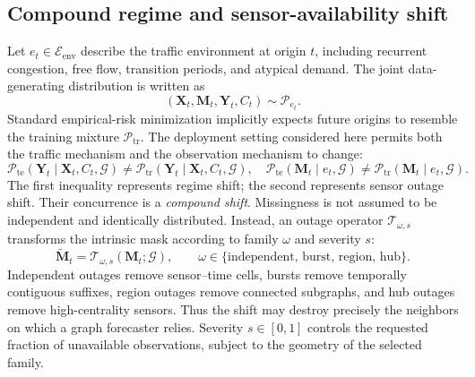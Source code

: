 \documentclass[preprint,12pt]{elsarticle}
\begin{document}
\subsection{Compound regime and sensor-availability shift}
Let $e_t\in\mathcal{E}_{\mathrm{env}}$ describe the traffic environment at
origin $t$, including recurrent congestion, free flow, transition periods, and
atypical demand. The joint data-generating distribution is written as
\begin{equation}
 (\mathbf{X}_t,\mathbf{M}_t,\mathbf{Y}_t,C_t)\sim
 \mathcal{P}_{e_t}.
\end{equation}
Standard empirical-risk minimization implicitly expects future origins to
resemble the training mixture $\mathcal{P}_{\mathrm{tr}}$. The deployment
setting considered here permits both the traffic mechanism and the observation
mechanism to change:
\begin{equation}
 \mathcal{P}_{\mathrm{te}}(\mathbf{Y}_t\mid\mathbf{X}_t,C_t,\mathcal{G})
 \ne \mathcal{P}_{\mathrm{tr}}(\mathbf{Y}_t\mid\mathbf{X}_t,C_t,\mathcal{G}),
 \quad
 \mathcal{P}_{\mathrm{te}}(\mathbf{M}_t\mid e_t,\mathcal{G})
 \ne \mathcal{P}_{\mathrm{tr}}(\mathbf{M}_t\mid e_t,\mathcal{G}).
 \label{eq:compound-shift}
\end{equation}
The first inequality represents regime shift; the second represents sensor
outage shift. Their concurrence is a \emph{compound shift}. Missingness is not
assumed to be independent and identically distributed. Instead, an outage
operator $\mathcal{T}_{\omega,s}$ transforms the intrinsic mask according to
family $\omega$ and severity $s$:
\begin{equation}
 \widetilde{\mathbf{M}}_t=
 \mathcal{T}_{\omega,s}(\mathbf{M}_t;\mathcal{G}),
 \qquad
 \omega\in\{\text{independent, burst, region, hub}\}.
 \label{eq:outage-operator}
\end{equation}
Independent outages remove sensor--time cells, bursts remove temporally
contiguous suffixes, region outages remove connected subgraphs, and hub outages
remove high-centrality sensors. Thus the shift may destroy precisely the
neighbors on which a graph forecaster relies. Severity $s\in[0,1]$ controls the
requested fraction of unavailable observations, subject to the geometry of the
selected family.
\end{document}
